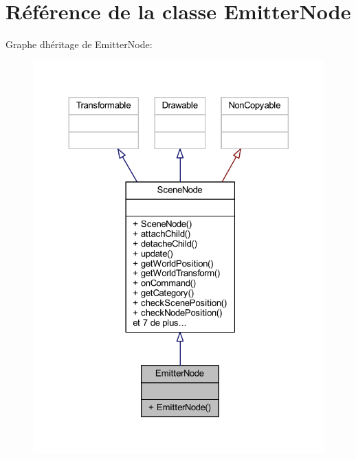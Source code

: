 \hypertarget{class_emitter_node}{}\section{Référence de la classe Emitter\+Node}
\label{class_emitter_node}


Graphe d\textquotesingle{}héritage de Emitter\+Node\+:\nopagebreak
\begin{figure}[H]
\begin{center}
\leavevmode
\includegraphics[width=324pt]{class_emitter_node__inherit__graph}
\end{center}
\end{figure}


